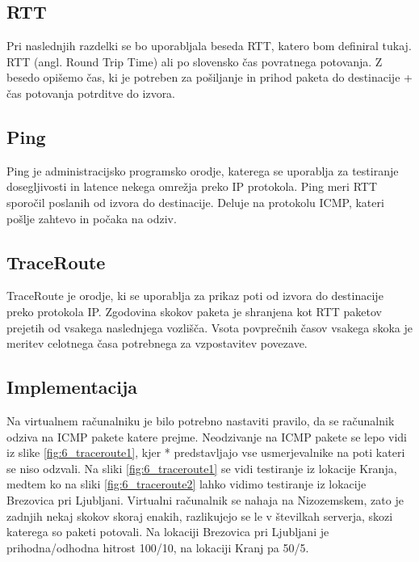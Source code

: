 \subsection{RTT}
Pri naslednjih razdelki se bo uporabljala beseda RTT, katero bom definiral tukaj. RTT (angl. Round Trip Time) ali po slovensko čas povratnega potovanja. Z besedo opišemo čas, ki je potreben za pošiljanje in prihod paketa do destinacije + čas potovanja potrditve do izvora.

\subsection{Ping}
Ping je administracijsko programsko orodje, katerega se uporablja za testiranje dosegljivosti in latence nekega omrežja preko IP protokola. Ping meri RTT sporočil poslanih od izvora do destinacije. Deluje na protokolu ICMP, kateri pošlje zahtevo in počaka na odziv.

\subsection{TraceRoute}
TraceRoute je orodje, ki se uporablja za prikaz poti od izvora do destinacije preko protokola IP. Zgodovina skokov paketa je shranjena kot RTT paketov prejetih od vsakega naslednjega vozlišča. Vsota povprečnih časov vsakega skoka je meritev celotnega časa potrebnega za vzpostavitev povezave.

\subsection{Implementacija}
Na virtualnem računalniku je bilo potrebno nastaviti pravilo, da se računalnik odziva na ICMP pakete katere prejme. Neodzivanje na ICMP pakete se lepo vidi iz slike \ref{fig:6_traceroute1}, kjer * predstavljajo vse usmerjevalnike na poti kateri se niso odzvali. Na sliki \ref{fig:6_traceroute1} se vidi testiranje iz lokacije Kranja, medtem ko na sliki \ref{fig:6_traceroute2} lahko vidimo testiranje iz lokacije Brezovica pri Ljubljani. Virtualni računalnik se nahaja na Nizozemskem, zato je zadnjih nekaj skokov skoraj enakih, razlikujejo se le v številkah serverja, skozi katerega so paketi potovali. Na lokaciji Brezovica pri Ljubljani je prihodna/odhodna hitrost 100/10, na 
lokaciji Kranj pa 50/5. 

